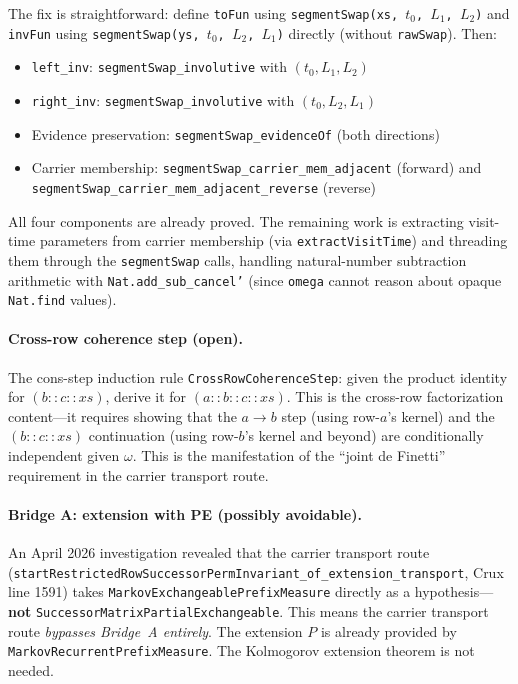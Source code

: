 \documentclass[11pt]{article}
\theoremstyle{definition}
\newcommand{\lean}[1]{\texttt{#1}}
\begin{document}
The fix is straightforward: define \lean{toFun} using
\lean{segmentSwap(xs, $t_0$, $L_1$, $L_2$)} and \lean{invFun}
using \lean{segmentSwap(ys, $t_0$, $L_2$, $L_1$)} directly (without
\lean{rawSwap}). Then:
\begin{itemize}[leftmargin=2em]
\item \lean{left\_inv}: \lean{segmentSwap\_involutive} with $(t_0, L_1, L_2)$
\item \lean{right\_inv}: \lean{segmentSwap\_involutive} with $(t_0, L_2, L_1)$
\item Evidence preservation: \lean{segmentSwap\_evidenceOf} (both directions)
\item Carrier membership: \lean{segmentSwap\_carrier\_mem\_adjacent} (forward)
  and \lean{segmentSwap\_carrier\_mem\_adjacent\_reverse} (reverse)
\end{itemize}
All four components are already proved.  The remaining work is
extracting visit-time parameters from carrier membership (via
\lean{extractVisitTime}) and threading them through the
\lean{segmentSwap} calls, handling natural-number subtraction
arithmetic with \lean{Nat.add\_sub\_cancel'} (since \lean{omega}
cannot reason about opaque \lean{Nat.find} values).

\paragraph{Cross-row coherence step (open).}
The cons-step induction rule \lean{CrossRowCoherenceStep}: given the
product identity for $(b :: c :: xs)$, derive it for $(a :: b :: c :: xs)$.
This is the cross-row factorization content---it requires showing that
the $a \to b$ step (using row-$a$'s kernel) and the $(b :: c :: xs)$
continuation (using row-$b$'s kernel and beyond) are conditionally
independent given $\omega$.  This is the manifestation of the ``joint
de Finetti'' requirement in the carrier transport route.

\paragraph{Bridge A: extension with PE (possibly avoidable).}
An April 2026 investigation revealed that the carrier transport route
(\lean{startRestrictedRowSuccessorPermInvariant\_of\_extension\_transport},
Crux line 1591) takes \lean{MarkovExchangeablePrefixMeasure} directly
as a hypothesis---\textbf{not} \lean{SuccessorMatrixPartialExchangeable}.
This means the carrier transport route \emph{bypasses Bridge~A entirely}.
The extension $P$ is already provided by \lean{MarkovRecurrentPrefixMeasure}.
The Kolmogorov extension theorem is not needed.
\end{document}
